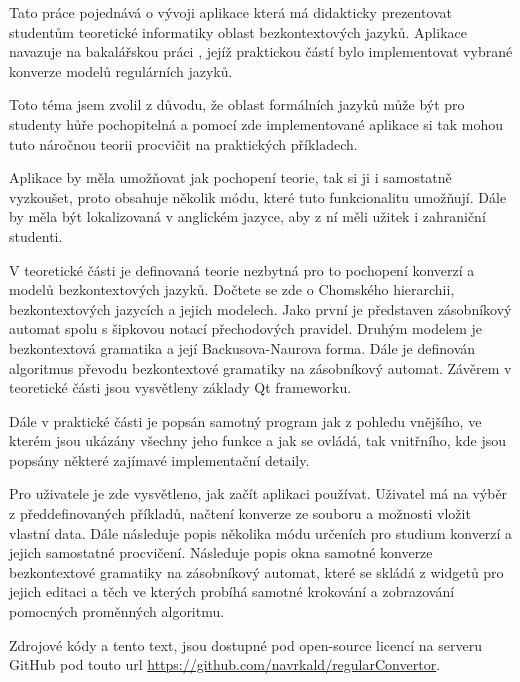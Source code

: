 
Tato práce pojednává o vývoji aplikace která má didakticky prezentovat studentům teoretické informatiky oblast bezkontextových jazyků. Aplikace navazuje na bakalářskou práci \cite{bakalarka} , jejíž praktickou částí bylo implementovat vybrané konverze modelů regulárních jazyků. 

Toto téma jsem zvolil z důvodu, že oblast formálních jazyků může být pro studenty hůře pochopitelná a pomocí zde implementované aplikace si tak mohou tuto náročnou teorii procvičit na praktických příkladech.

Aplikace by měla umožňovat jak pochopení teorie, tak si ji i samostatně vyzkoušet, proto obsahuje několik módu, které tuto funkcionalitu umožňují. Dále by měla být lokalizovaná v anglickém jazyce, aby z ní měli užitek i zahraniční studenti.

V teoretické části je definovaná teorie nezbytná pro to pochopení konverzí a modelů bezkontextových jazyků. Dočtete se zde o Chomského hierarchii, bezkontextových jazycích a jejich modelech. Jako první je představen zásobníkový automat spolu s šipkovou notací přechodových pravidel. Druhým modelem je bezkontextová gramatika a její Backusova-Naurova forma. Dále je definován algoritmus převodu bezkontextové gramatiky na zásobníkový automat. Závěrem v teoretické části jsou vysvětleny základy Qt frameworku.

Dále v praktické části je popsán samotný program jak z pohledu vnějšího, ve kterém jsou ukázány všechny jeho funkce a jak se ovládá, tak vnitřního, kde jsou popsány některé zajímavé implementační detaily.

Pro uživatele je zde vysvětleno, jak začít aplikaci používat. Uživatel má na výběr z předdefinovaných příkladů, načtení konverze ze souboru a možnosti vložit vlastní data. Dále následuje popis několika módu určeních pro studium konverzí a jejich samostatné procvičení. Následuje popis okna samotné konverze bezkontextové gramatiky na zásobníkový automat, které se skládá z widgetů pro jejich editaci a těch ve kterých probíhá samotné krokování a zobrazování pomocných proměnných algoritmu. 

Zdrojové kódy a tento text, jsou dostupné pod open-source licencí na serveru GitHub pod touto url \url{https://github.com/navrkald/regularConvertor}.

